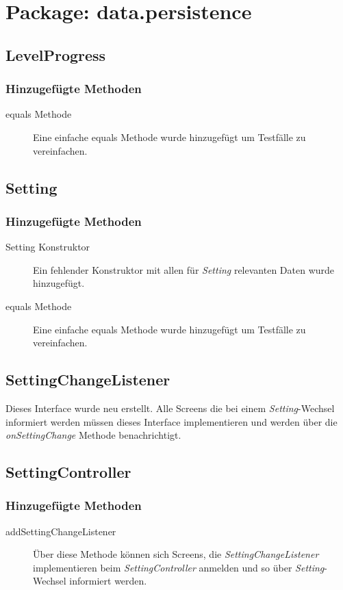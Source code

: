 \section{Package: data.persistence}

\subsection{LevelProgress}

\subsubsection{Hinzugefügte Methoden}
\begin{description}
\item[equals Methode]
Eine einfache equals Methode wurde hinzugefügt um Testfälle zu vereinfachen.
\end{description}

\subsection{Setting}
\subsubsection{Hinzugefügte Methoden}
\begin{description}
\item[Setting Konstruktor]
Ein fehlender Konstruktor mit allen für \emph{Setting} relevanten Daten wurde hinzugefügt.
\item[equals Methode]
Eine einfache equals Methode wurde hinzugefügt um Testfälle zu vereinfachen.

\end{description}

\subsection{SettingChangeListener}

Dieses Interface wurde neu erstellt. Alle Screens die bei einem  \emph{Setting}-Wechsel informiert werden müssen  dieses Interface implementieren und werden über die \emph{onSettingChange} Methode benachrichtigt.


\subsection{SettingController}

\subsubsection{Hinzugefügte Methoden}
\begin{description}
\item[addSettingChangeListener]
Über diese Methode können sich Screens, die \emph{SettingChangeListener} implementieren beim \emph{SettingController} anmelden und so über \emph{Setting}-Wechsel informiert werden.
\end{description}


